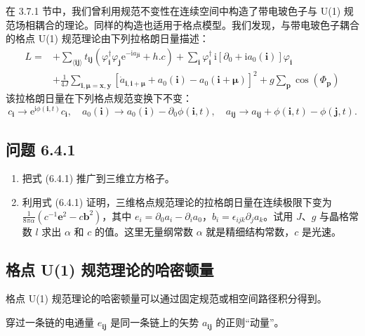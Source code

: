 在 3.7.1 节中，我们曾利用规范不变性在连续空间中构造了带电玻色子与 U(1) 规范场相耦合的理论。同样的构造也适用于格点模型。我们发现，与带电玻色子耦合的格点 U(1) 规范理论由下列拉格朗日量描述：
\begin{align*}
L={}&+\sum_{\langle\pmb{i}\pmb{j}\rangle}t_{\pmb{i}\pmb{j}}\left(\varphi_{\pmb{i}}^{\dagger}\varphi_{\pmb{j}}\mathrm{e}^{-\mathrm{i}a_{\pmb{j}\pmb{i}}}+h.c\right)+\sum_{\pmb{i}}\varphi_{\pmb{i}}^{\dagger}\,\mathrm{i}\left[\partial_{0}+\mathrm{i}a_{0}(\pmb{i})\right]\varphi_{\pmb{i}}\\
&+\frac{1}{4J}\sum_{\pmb{i},\pmb{\mu}=\pmb{x},\pmb{y}}\left[\dot{a}_{\pmb{i},\pmb{i}+\pmb{\mu}}+a_{0}(\pmb{i})-a_{0}(\pmb{i}+\pmb{\mu})\right]^{2}+g\sum_{\pmb{p}}\cos(\Phi_{\pmb{p}}) \tag{6.4.9}
\end{align*}
该拉格朗日量在下列格点规范变换下不变：
\begin{equation*}
c_{\pmb{i}}\rightarrow\mathrm{e}^{\mathrm{i}\phi(\pmb{i},t)}c_{\pmb{i}}, \quad a_{0}(\pmb{i})\rightarrow a_{0}(\pmb{i})-\partial_{0}\phi(\pmb{i},t), \quad a_{\pmb{i}\pmb{j}}\rightarrow a_{\pmb{i}\pmb{j}}+\phi(\pmb{i},t)-\phi(\pmb{j},t).
\end{equation*}

\subsection*{问题 6.4.1}

\begin{enumerate}
\item[(a)] 把式 (6.4.1) 推广到三维立方格子。
\item[(b)] 利用式 (6.4.1) 证明，三维格点规范理论的拉格朗日量在连续极限下变为 $\frac{1}{8\pi\alpha}(c^{-1}\pmb{e}^{2}-c\pmb{b}^{2})$，其中 $e_{i}=\partial_{0}a_{i}-\partial_{i}a_{0}$，$b_{i}=\epsilon_{ijk}\partial_{j}a_{k}$。试用 $J$、$g$ 与晶格常数 $l$ 求出 $\alpha$ 和 $c$ 的值。这里无量纲常数 $\alpha$ 就是精细结构常数，$c$ 是光速。
\end{enumerate}


\subsection{格点 U(1) 规范理论的哈密顿量}

\begin{keypoints}
\item 格点 U(1) 规范理论的哈密顿量可以通过固定规范或相空间路径积分得到。
\item 穿过一条链的电通量 $e_{\pmb{i}\pmb{j}}$ 是同一条链上的矢势 $a_{\pmb{i}\pmb{j}}$ 的正则“动量”。
\end{keypoints}

